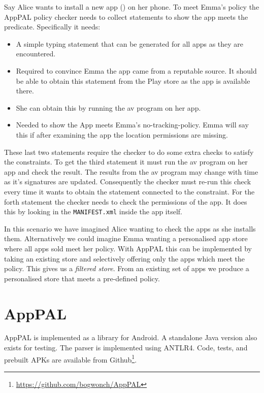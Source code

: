 \documentclass[twoside,letterpaper]{soups}
\begin{document}
Say Alice wants to install a new app () on her phone.
To meet Emma's policy the AppPAL policy checker needs to collect statements to show the app meets the  predicate.
Specifically it needs:
\begin{itemize}
  \item{}
    A simple typing statement that can be generated for all apps as they are encountered.
  \item{}
    Required to convince Emma the app came from a reputable source.
    It should be able to obtain this statement from the Play store as the app is available there.
  \item{}
    She can obtain this by running the \ac{av} program on her app.
  \item{}
    Needed to show the App meets Emma's no-tracking-policy.
    Emma will say this if after examining the app the location permissions are missing.
\end{itemize}
These last two statements require the checker to do some extra checks to satisfy the constraints.
To get the third statement it must run the \ac{av} program on her app and check the result.
The results from the \ac{av} program may change with time as it's signatures are updated.
Consequently the checker must re-run this check every time it wants to obtain the statement connected to the constraint.
For the forth statement the checker needs to check the permissions of the app.
It does this by looking in the \texttt{MANIFEST.xml} inside the app itself.

In this scenario we have imagined Alice wanting to check the apps as she installs them.
Alternatively we could imagine Emma wanting a personalised app store where all apps sold meet her policy.
With AppPAL this can be implemented by taking an existing store and selectively offering only the apps which meet the policy.
This gives us a \emph{filtered store}.
From an existing set of apps we produce a personalised store that meets a pre-defined policy.

\section{AppPAL}
\label{sec:details}

AppPAL is implemented as a library for Android.
A standalone Java version also exists for testing.
The parser is implemented using ANTLR4.
Code, tests, and prebuilt APKs are available from Github\footnote{\url{https://github.com/bogwonch/AppPAL}}.
\end{document}
